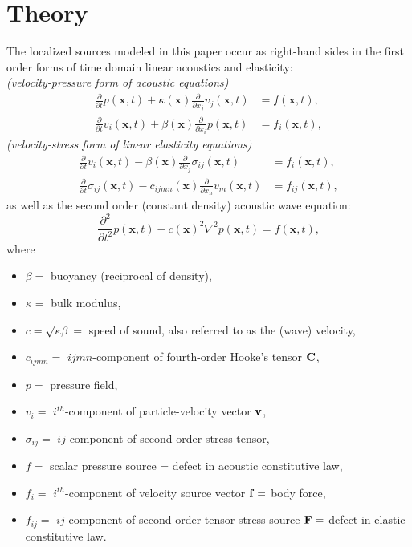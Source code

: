 \section{Theory}

The localized sources modeled in this paper occur as right-hand sides in the first order forms of time domain linear acoustics and elasticity:\\
{\em (velocity-pressure form of acoustic equations)}
\begin{equation}
\label{eq:acous}
\begin{split}
		\frac{\partial}{\partial t} p(\mathbf x,t) + \kappa(\mathbf x)\frac{\partial}{\partial x_j}v_j(\mathbf x,t) &= f(\mathbf x,t),\\
                \frac{\partial}{\partial t} v_i(\mathbf x,t) + \beta(\mathbf x)\frac{\partial}{\partial x_i}p(\mathbf x,t) &= f_i(\mathbf x,t),
\end{split}
\end{equation}
\emph{(velocity-stress form of linear elasticity equations)}
\begin{equation}\label{eq:elas}
\begin{split}
		\frac{\partial}{\partial t} v_i(\mathbf x,t) - \beta(\mathbf x) \frac{\partial}{\partial x_j} \sigma_{ij}(\mathbf x,t) &= f_i(\mathbf x,t), \\
		\frac{\partial}{\partial t} \sigma_{ij}(\mathbf x,t) - c_{ijmn}(\mathbf x) \frac{\partial}{\partial x_n} v_m(\mathbf x,t) &= f_{ij}(\mathbf x,t),
\end{split}
\end{equation}
as well as the second order (constant density) acoustic wave equation:
\begin{equation}
\label{eq:wave_acous}
		\frac{\partial^2}{\partial t^2} p(\mathbf x,t) - c(\mathbf x)^2 \nabla^2 p(\mathbf x,t) = f(\mathbf x,t),
\end{equation}
where
\begin{singlespace}
\begin{itemize}
	\item $\beta =$ buoyancy (reciprocal of density), 
	\item $\kappa =$ bulk modulus,
	\item $c = \sqrt{\kappa\beta} = $ speed of sound, also referred to as the (wave) velocity,
	\item $c_{ijmn} = $ $ijmn$-component of fourth-order Hooke's tensor $\bf C$,
	\item $p = $ pressure field, 
	\item $v_i =$ $i^{th}$-component of particle-velocity vector $\bf v$,
	\item $\sigma_{ij} = $ $ij$-component of second-order stress tensor,
	\item $f =$ scalar pressure source = defect in acoustic
          constitutive law,
	\item $f_i = $ $i^{th}$-component of velocity
          source vector $\bf f=$ body force,
	\item $f_{ij} = $ $ij$-component of second-order
          tensor stress source $\bf F=$ defect in elastic constitutive law.
\end{itemize}
\end{singlespace}
